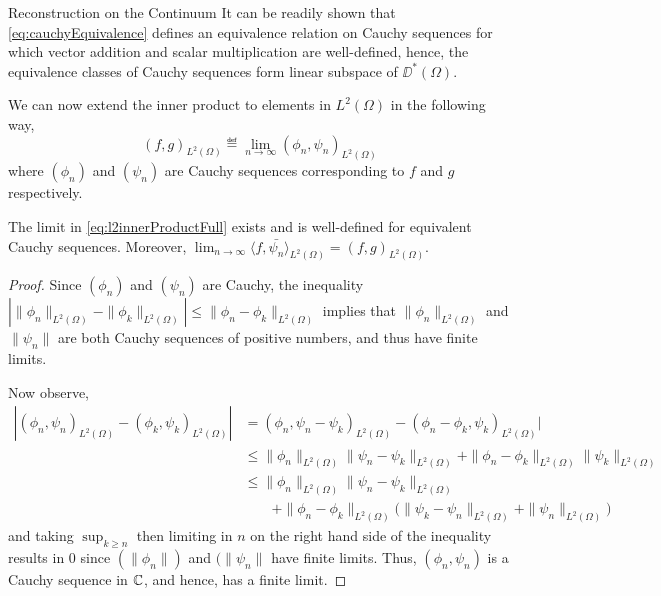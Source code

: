 \begin{chapter}{Reconstruction on the Continuum}
It can be readily shown that \eqref{eq:cauchyEquivalence} defines an equivalence relation on Cauchy sequences for which vector addition and scalar multiplication are well-defined, hence, the equivalence classes of Cauchy sequences form linear subspace of $\DD^*(\Omega)$.

We can now extend the inner product to elements in $L^2(\Omega)$ in the following way,
\begin{equation} \label{eq:l2innerProductFull}
  (f,g)_{L^2(\Omega)} \eqdef \lim_{n\to\infty} (\phi_n,\psi_n)_{L^2(\Omega)}
\end{equation}
where $(\phi_n)$ and $(\psi_n)$ are Cauchy sequences corresponding to $f$ and $g$ respectively.
\begin{prop}
  The limit in \eqref{eq:l2innerProductFull} exists and is well-defined for equivalent Cauchy sequences. 
  Moreover, $\lim_{n\to\infty} \langle f,\bar{\psi_n}\rangle _{L^2(\Omega)} = (f,g)_{L^2(\Omega)}$.
\end{prop}
\begin{proof}
  Since $(\phi_n)$ and $(\psi_n)$ are Cauchy, the inequality $|\|\phi_n\|_{L^2(\Omega)} - \|\phi_k\|_{L^2(\Omega)}| \le \|\phi_n - \phi_k\|_{L^2(\Omega)}$ implies that $\|\phi_n\|_{L^2(\Omega)}$ and $\|\psi_n\|$ are both Cauchy sequences of positive numbers, and thus have finite limits.

Now observe,
\begin{align}
  |(\phi_n,\psi_n)_{L^2(\Omega)} - (\phi_k,\psi_k)_{L^2(\Omega)}| 
    &= (\phi_n,\psi_n-\psi_k)_{L^2(\Omega)} -(\phi_n-\phi_k,\psi_k)_{L^2(\Omega)}| \nonumber\\
    &\le \|\phi_n\|_{L^2(\Omega)}\|\psi_n-\psi_k\|_{L^2(\Omega)} + \|\phi_n - \phi_k\|_{L^2(\Omega)}\|\psi_k\|_{L^2(\Omega)} \nonumber\\
    &\le \|\phi_n\|_{L^2(\Omega)}\|\psi_n-\psi_k\|_{L^2(\Omega)} \nonumber\\
    &\quad\quad+ \|\phi_n - \phi_k\|_{L^2(\Omega)}\big(\|\psi_k - \psi_n\|_{L^2(\Omega)} + \|\psi_n\|_{L^2(\Omega)}\big)
\end{align}
and taking $\sup_{k\ge n}$ then limiting in $n$ on the right hand side of the inequality results in 0 since $(\|\phi_n\|)$ and $(\|\psi_n\|$ have finite limits.
Thus, $(\phi_n,\psi_n)$ is a Cauchy sequence in $\mathbb C$, and hence, has a finite limit.


\end{proof}
\end{chapter}
